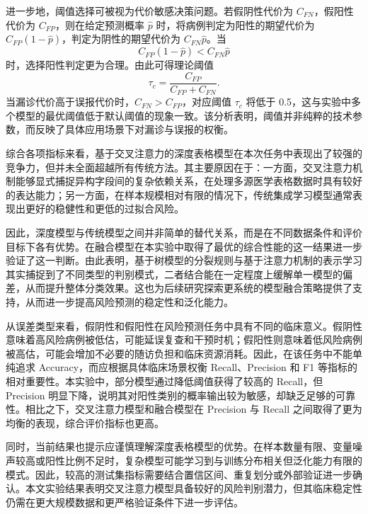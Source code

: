 进一步地，阈值选择可被视为代价敏感决策问题。若假阴性代价为 $C_{FN}$，假阳性代价为 $C_{FP}$，则在给定预测概率 $\hat{p}$ 时，将病例判定为阳性的期望代价为 $C_{FP}(1-\hat{p})$，判定为阴性的期望代价为 $C_{FN}\hat{p}$。当
\begin{equation}
C_{FP}(1-\hat{p}) < C_{FN}\hat{p}
\end{equation}
时，选择阳性判定更为合理。由此可得理论阈值
\begin{equation}
\tau_c=\frac{C_{FP}}{C_{FP}+C_{FN}}.
\end{equation}
当漏诊代价高于误报代价时，$C_{FN}>C_{FP}$，对应阈值 $\tau_c$ 将低于 0.5，这与实验中多个模型的最优阈值低于默认阈值的现象一致。该分析表明，阈值并非纯粹的技术参数，而反映了具体应用场景下对漏诊与误报的权衡。


综合各项指标来看，基于交叉注意力的深度表格模型在本次任务中表现出了较强的竞争力，但并未全面超越所有传统方法。其主要原因在于：一方面，交叉注意力机制能够显式捕捉异构字段间的复杂依赖关系，在处理多源医学表格数据时具有较好的表达能力；另一方面，在样本规模相对有限的情况下，传统集成学习模型通常表现出更好的稳健性和更低的过拟合风险。

因此，深度模型与传统模型之间并非简单的替代关系，而是在不同数据条件和评价目标下各有优势。在融合模型在本实验中取得了最优的综合性能的这一结果进一步验证了这一判断。由此表明，基于树模型的分裂规则与基于注意力机制的表示学习其实捕捉到了不同类型的判别模式，二者结合能在一定程度上缓解单一模型的偏差，从而提升整体分类效果。这也为后续研究探索更系统的模型融合策略提供了支持，从而进一步提高风险预测的稳定性和泛化能力。

从误差类型来看，假阴性和假阳性在风险预测任务中具有不同的临床意义。假阴性意味着高风险病例被低估，可能延误复查和干预时机；假阳性则意味着低风险病例被高估，可能会增加不必要的随访负担和临床资源消耗。因此，在该任务中不能单纯追求 Accuracy，而应根据具体临床场景权衡 Recall、Precision 和 F1 等指标的相对重要性。本实验中，部分模型通过降低阈值获得了较高的 Recall，但 Precision 明显下降，说明其对阳性类别的概率输出较为敏感，却缺乏足够的可靠性。相比之下，交叉注意力模型和融合模型在 Precision 与 Recall 之间取得了更为均衡的表现，综合评价指标也更高。

同时，当前结果也提示应谨慎理解深度表格模型的优势。在样本数量有限、变量噪声较高或阳性比例不足时，复杂模型可能学习到与训练分布相关但泛化能力有限的模式。因此，较高的测试集指标需要结合置信区间、重复划分或外部验证进一步确认。本文实验结果表明交叉注意力模型具备较好的风险判别潜力，但其临床稳定性仍需在更大规模数据和更严格验证条件下进一步评估。

